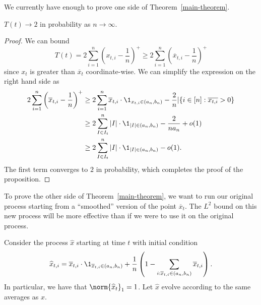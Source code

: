 \documentclass[12pt]{article}
\begin{document}
We currently have enough to prove one side of Theorem~\ref{main-theorem}.

\begin{prop} \label{WOOHOOWOOHOO}
	$T(t) \to 2$ in probability as $n \to \infty$. 
\end{prop}
\begin{proof}
	We can bound
	\[
		T(t) = 2 \sum_{i = 1}^n \left ( x_{t, i} - \frac{1}{n} \right )^+ \geq 2 \sum_{i = 1}^n \left ( \overline{x}_{t, i} - \frac{1}{n} \right )^+
	\]
	since $x_t$ is greater than $\overline{x}_t$ coordinate-wise. We can simplify the expression on the right hand side as
	\begin{align*}
		2 \sum_{i = 1}^n \left ( \overline{x}_{t, i} - \frac{1}{n} \right )^+ & \geq 2 \sum_{i = 1}^n \overline{x}_{t, i} \cdot \1_{x_{t, i} \in (a_n, b_n)} - \frac{2}{n} | \{ i \in [n] : \overline{x_{t, i}} > 0\} \\
		& \geq 2 \sum_{I \in I_t}^n |I| \cdot \1_{|I| \in (a_n, b_n)} - \frac{2}{n a_n} + o(1) \\
		& \geq 2 \sum_{I \in I_t}^n |I| \cdot \1_{|I| \in (a_n, b_n)} - o(1). 
	\end{align*}
	The first term converges to $2$ in probability, which completes the proof of the proposition. 
\end{proof}

To prove the other side of Theorem~\ref{main-theorem}, we want to run our original process starting from a ``smoothed'' version of the point $\overline{x}_t$. The $L^2$ bound on this new process will be more effective than if we were to use it on the original process. 
\begin{defn}
	Consider the process $\widehat{x}$ starting at time $t$ with initial condition
	\[
		\widehat{x}_{t, i} = \overline{x}_{t, i} \cdot \1_{\overline{x}_{t, i} \in (a_n, b_n)} + \frac{1}{n} \left ( 1 - \sum_{i : \overline{x}_{t, i} \in (a_n, b_n)} \overline{x}_{t, i} \right ).
	\]
	In particular, we have that $\norm{\widehat{x}_t}_1 = 1$. Let $\widehat{x}$ evolve according to the same averages as $x$. 
\end{defn}
\end{document}
